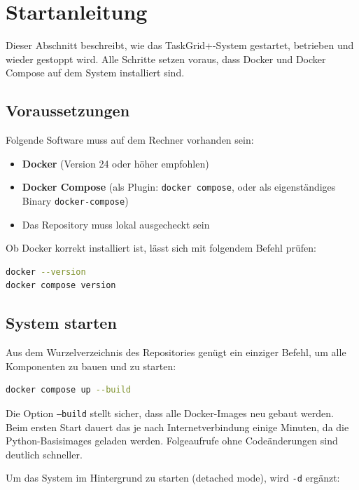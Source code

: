 \section{Startanleitung}
\label{sec:startanleitung}

Dieser Abschnitt beschreibt, wie das TaskGrid+{}-System gestartet, betrieben
und wieder gestoppt wird. Alle Schritte setzen voraus, dass Docker und
Docker Compose auf dem System installiert sind.

\subsection{Voraussetzungen}

Folgende Software muss auf dem Rechner vorhanden sein:

\begin{itemize}
  \item \textbf{Docker} (Version 24 oder höher empfohlen)
  \item \textbf{Docker Compose} (als Plugin: \texttt{docker compose}, oder als
        eigenständiges Binary \texttt{docker-compose})
  \item Das Repository muss lokal ausgecheckt sein
\end{itemize}

Ob Docker korrekt installiert ist, lässt sich mit folgendem Befehl prüfen:

\begin{lstlisting}[language=bash,caption={Docker-Versionsprüfung}]
docker --version
docker compose version
\end{lstlisting}

\subsection{System starten}

Aus dem Wurzelverzeichnis des Repositories genügt ein einziger Befehl,
um alle Komponenten zu bauen und zu starten:

\begin{lstlisting}[language=bash,caption={System starten}]
docker compose up --build
\end{lstlisting}

Die Option \texttt{--build} stellt sicher, dass alle Docker-Images neu gebaut werden.
Beim ersten Start dauert das je nach Internetverbindung einige Minuten, da die
Python-Basisimages geladen werden. Folgeaufrufe ohne Codeänderungen sind deutlich schneller.

Um das System im Hintergrund zu starten (detached mode), wird \texttt{-d} ergänzt:

